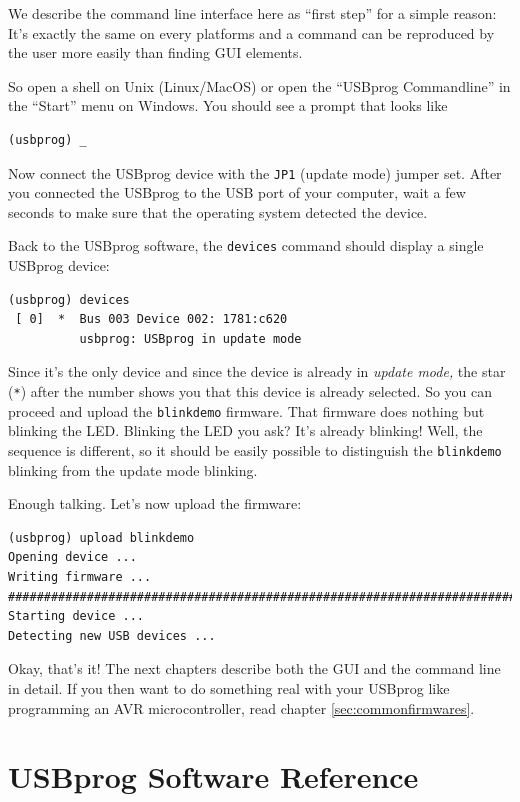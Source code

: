 \documentclass[bibtotoc,UKenglish,halfparskip,oneside,DIV12]{scrreprt}
\begin{document}
We describe the command line interface here as ``first step'' for a simple reason: It's exactly the
same on every platforms and a command can be reproduced by the user more easily than finding GUI
elements.

So open a shell on Unix (Linux/MacOS) or open the ``USBprog Commandline'' in the ``Start'' menu on
Windows. You should see a prompt that looks like

\begin{lstlisting}[style=inline]
(usbprog) _
\end{lstlisting}

Now connect the USBprog device with the \texttt{JP1} (update mode) jumper set.  After you connected
the USBprog to the USB port of your computer, wait a few seconds to make sure that the operating
system detected the device.

Back to the USBprog software, the \texttt{devices} command should display a single USBprog device:

\begin{lstlisting}[style=inline]
(usbprog) devices
 [ 0]  *  Bus 003 Device 002: 1781:c620
          usbprog: USBprog in update mode
\end{lstlisting}

Since it's the only device and since the device is already in \emph{update mode,} the star
(\texttt{*}) after the number shows you that this device is already selected. So you can proceed and
upload the \texttt{blinkdemo} firmware. That firmware does nothing but blinking the LED. Blinking
the LED you ask? It's already blinking! Well, the sequence is different, so it should be easily
possible to distinguish the \texttt{blinkdemo} blinking from the update mode blinking.

Enough talking. Let's now upload the firmware:

\begin{lstlisting}[style=inline]
(usbprog) upload blinkdemo
Opening device ...
Writing firmware ...
###############################################################################
Starting device ...
Detecting new USB devices ...
\end{lstlisting}

Okay, that's it! The next chapters describe both the GUI and the command line in detail. If you then
want to do something real with your USBprog like programming an AVR microcontroller, read chapter
\vref{sec:commonfirmwares}.

\chapter{USBprog Software Reference}
\end{document}

